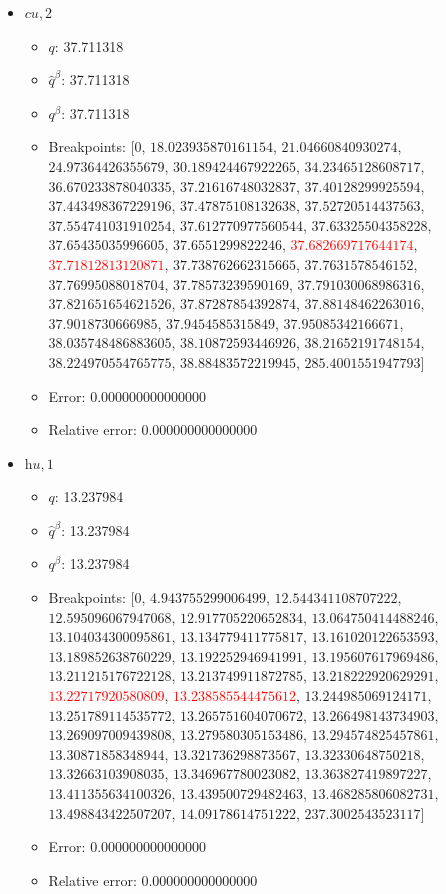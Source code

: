 \documentclass{article}%
\begin{document}
\begin{itemize}
\begin{itemize}
		\item Error: 0.000000000000000%
		\item Relative error: 0.000000000000000%
	\end{itemize}%
	\item $\textit{cu},2$%
	\begin{itemize}%
		\item $q$: 37.711318%
		\item $\hat{q}^\beta$: 37.711318%
		\item $q^\beta$: 37.711318%
		\item Breakpoints: $[$$0$, $18.023935870161154$, $21.04660840930274$, $24.97364426355679$, $30.189424467922265$, $34.23465128608717$, $36.670233878040335$, $37.21616748032837$, $37.40128299925594$, $37.443498367229196$, $37.47875108132638$, $37.52720514437563$, $37.554741031910254$, $37.612770977560544$, $37.63325504358228$, $37.65435035996605$, $37.6551299822246$, \textcolor{red}{$37.682669717644174$}, \textcolor{red}{$37.71812813120871$}, $37.738762662315665$, $37.7631578546152$, $37.76995088018704$, $37.78573239590169$, $37.791030068986316$, $37.821651654621526$, $37.87287854392874$, $37.88148462263016$, $37.9018730666985$, $37.9454585315849$, $37.95085342166671$, $38.035748486883605$, $38.10872593446926$, $38.21652191748154$, $38.224970554765775$, $38.88483572219945$, $285.4001551947793$$]$%
		\item Error: 0.000000000000000%
		\item Relative error: 0.000000000000000%
	\end{itemize}%
	\item $\textit{hu},1$%
	\begin{itemize}%
		\item $q$: 13.237984%
		\item $\hat{q}^\beta$: 13.237984%
		\item $q^\beta$: 13.237984%
		\item Breakpoints: $[$$0$, $4.943755299006499$, $12.544341108707222$, $12.595096067947068$, $12.917705220652834$, $13.064750414488246$, $13.104034300095861$, $13.134779411775817$, $13.161020122653593$, $13.189852638760229$, $13.192252946941991$, $13.195607617969486$, $13.211215176722128$, $13.213749911872785$, $13.218222920629291$, \textcolor{red}{$13.22717920580809$}, \textcolor{red}{$13.238585544475612$}, $13.244985069124171$, $13.251789114535772$, $13.265751604070672$, $13.266498143734903$, $13.269097009439808$, $13.279580305153486$, $13.294574825457861$, $13.30871858348944$, $13.321736298873567$, $13.32330648750218$, $13.32663103908035$, $13.346967780023082$, $13.363827419897227$, $13.411355634100326$, $13.439500729482463$, $13.468285806082731$, $13.498843422507207$, $14.09178614751222$, $237.3002543523117$$]$%
		\item Error: 0.000000000000000%
		\item Relative error: 0.000000000000000%
	\end{itemize}%
\end{itemize}%
\end{document}
